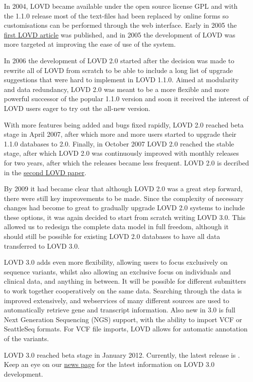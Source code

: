 \documentclass[a4paper,oneside,openany,12pt]{memoir}
\newcommand{\LOVDversion}{}                            %
\begin{document}
\par
In 2004, LOVD became available under the open source license GPL and with the 1.1.0 release most of the text-files had been replaced by online forms
so customisations can be performed through the web interface.
Early in 2005 the \href{http://www.ncbi.nlm.nih.gov/pubmed/15977173}{first LOVD article} was published,
and in 2005 the development of LOVD was more targeted at improving the ease of use of the system.
\\\par
In 2006 the development of LOVD 2.0 started after the decision was made to rewrite all of LOVD from scratch
to be able to include a long list of upgrade suggestions that were hard to implement in LOVD 1.1.0.
Aimed at modularity and data redundancy, LOVD 2.0 was meant to be a more flexible and more powerful successor of the popular 1.1.0 version
and soon it received the interest of LOVD users eager to try out the all-new version.
\par
With more features being added and bugs fixed rapidly, LOVD 2.0 reached beta stage in April 2007,
after which more and more users started to upgrade their 1.1.0 databases to 2.0.
Finally, in October 2007 LOVD 2.0 reached the stable stage, after which LOVD 2.0 was continuously improved with monthly releases for two years,
after which the releases became less frequent.
LOVD 2.0 is decribed in the \href{http://www.ncbi.nlm.nih.gov/pubmed/21520333}{second LOVD paper}.
\\\par
By 2009 it had became clear that although LOVD 2.0 was a great step forward, there were still key improvements to be made.
Since the complexity of necessary changes had become to great to gradually upgrade LOVD 2.0 systems to include these options,
it was again decided to start from scratch writing LOVD 3.0.
This allowed us to redesign the complete data model in full freedom,
although it should still be possible for existing LOVD 2.0 databases to have all data transferred to LOVD 3.0.
\par
LOVD 3.0 adds even more flexibility, allowing users to focus exclusively on sequence variants,
whilst also allowing an exclusive focus on individuals and clinical data, and anything in between.
It will be possible for different submitters to work together cooperatively on the same data.
Searching through the data is improved extensively,
and webservices of many different sources are used to automatically retrieve gene and transcript information.
Also new in 3.0 is full Next Generation Sequencing (NGS) support,
with the ability to import VCF or SeattleSeq formats.
For VCF file imports, LOVD allows for automatic annotation of the variants.
\par
LOVD 3.0 reached beta stage in January 2012. Currently, the latest release is \LOVDversion.
Keep an eye on our \href{http://www.lovd.nl/3.0/news}{news page} for the latest information on LOVD 3.0 development.
\end{document}
